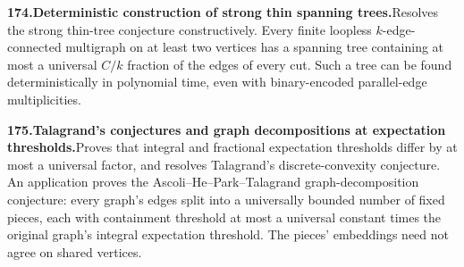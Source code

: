 \documentclass[11pt,a4paper]{article}
\begin{document}
  \par \begin{minipage}{\linewidth}
  \fontsize{10.5}{12.6}\selectfont\RaggedRight
  \hypertarget{result 174}{}
  {\bfseries\textcolor{muted}{174.}\enspace Deterministic construction of strong thin spanning trees.}\enspace Resolves the strong thin-tree conjecture constructively. Every finite loopless $k$-edge-connected multigraph on at least two vertices has a spanning tree containing at most a universal $C/k$ fraction of the edges of every cut. Such a tree can be found deterministically in polynomial time, even with binary-encoded parallel-edge multiplicities.\par
  \end{minipage}\par\vspace{5pt}



  \par \begin{minipage}{\linewidth}
  \fontsize{10.5}{12.6}\selectfont\RaggedRight
  \hypertarget{result 175}{}
  {\bfseries\textcolor{muted}{175.}\enspace Talagrand's conjectures and graph decompositions at expectation thresholds.}\enspace Proves that integral and fractional expectation thresholds differ by at most a universal factor, and resolves Talagrand's discrete-convexity conjecture. An application proves the Ascoli--He--Park--Talagrand graph-decomposition conjecture: every graph's edges split into a universally bounded number of fixed pieces, each with containment threshold at most a universal constant times the original graph's integral expectation threshold. The pieces' embeddings need not agree on shared vertices.\par
  \end{minipage}\par\vspace{5pt}
\end{document}
